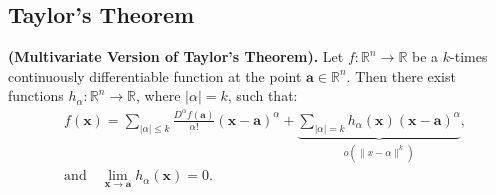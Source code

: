 \documentclass[11pt,a4paper]{article}
\theoremstyle{definition}
\theoremstyle{plain}
\newcommand{\R}{\mathbb{R}}
\renewcommand{\tt}[1]{\textnormal{\textbf{(#1).}}} %
\begin{document}
	\subsection{Taylor's Theorem}
	\tt{Multivariate Version of Taylor's Theorem}
	Let $f \colon \R^n \to \R$ be a $k$-times continuously differentiable 
	function at the point $\boldsymbol{a} \in \R^n$. Then there exist functions 
	$h_\alpha \colon \R^n \to \R$, where $|\alpha| = k$, such that:
	\[
		{\begin{aligned}&f({\boldsymbol {x}})=\sum _{|\alpha |\leq k}{\frac 
		{D^{\alpha }f({\boldsymbol {a}})}{\alpha !}}({\boldsymbol {x}}-
		{\boldsymbol 
		{a}})^{\alpha }+\underbrace{\sum _{|\alpha |=k}h_{\alpha }({\boldsymbol 
		{x}})({\boldsymbol {x}}-{\boldsymbol {a}})^{\alpha }}_{o(\|x-\alpha\|
		^k)},\\&{\mbox{and}}\quad \lim _{{\boldsymbol {x}}\to {\boldsymbol {a}}}
		h_{\alpha }({\boldsymbol {x}})=0.\end{aligned}}
	\]
	
	\newpage
	
\end{document}
